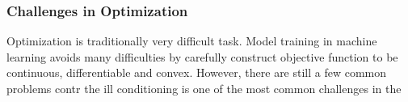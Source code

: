 \subsubsection{Challenges in Optimization}

Optimization is traditionally very difficult task. Model training in machine learning avoids many difficulties by carefully construct objective function to be continuous, differentiable and convex. However, there are still a few common problems contr
the ill conditioning is one of the most common challenges in the 